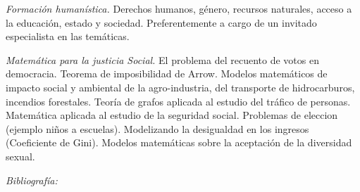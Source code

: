 \documentclass[a4paper, 12pt]{article}
\begin{document}
\begin{description}
 \item{\emph{Formación humanística.}}  Derechos humanos, género, recursos naturales, acceso a la educación, estado y sociedad. Preferentemente a cargo de un  invitado especialista en las temáticas.
 
 \item{\emph{Matemática para la justicia Social.}} El problema del recuento de votos en democracia. Teorema de imposibilidad de Arrow. Modelos matemáticos de impacto social y ambiental de la agro-industria, del transporte de hidrocarburos, incendios forestales. Teoría de grafos aplicada al estudio del tráfico de personas.  Matemática aplicada al estudio de la seguridad social. Problemas de eleccion (ejemplo niños a escuelas). Modelizando la desigualdad en los ingresos (Coeficiente de Gini). Modelos matemáticas sobre la aceptación de la diversidad sexual.   
\end{description}


\emph{Bibliografía:} \cite{buell2021mathematics,karaali2021mathematics,karaali2019mathematics,doi:10.1080/10511970.2018.1530707,doi:10.1080/10511970.2018.1512538,doi:10.1080/10511970.2018.1456498,doi:10.1080/10511970.2018.1530706,doi:10.1080/10511970.2018.1456497,doi:10.1080/10511970.2018.1472683,FredRoberts1395,JuanCarlosCortes1396,DonaldG.Saari1397,LeeRudolph1398,UrszulaStrawinska-Zanko1399,HuijiongWang1400,AhmadK.Naimzada1401,ClaudioCioffi-Revilla1402}

 







\end{document}
